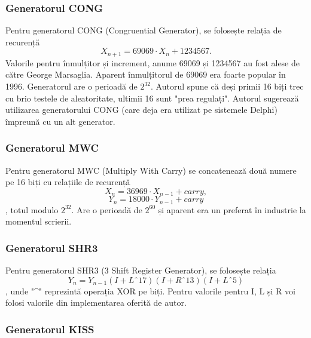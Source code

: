 \subsubsection{Generatorul CONG}

Pentru generatorul CONG (Congruential Generator), se folosește relația de recurență
\[
X_{n+1} = 69069 \cdot X_{n} + 1234567.
\]
Valorile pentru înmulțitor și increment, anume 69069 și 1234567 au fost alese de către George Marsaglia. Aparent înmulțitorul de 69069 era foarte popular în 1996. Generatorul are o perioadă de $2^{32}$. Autorul spune că deși primii 16 biți trec cu brio testele de aleatoritate, ultimii 16 sunt "prea regulați". Autorul sugerează utilizarea generatorului CONG (care deja era utilizat pe sistemele Delphi) împreună cu un alt generator.

\subsubsection{Generatorul MWC}

Pentru generatorul MWC (Multiply With Carry) se concatenează două numere pe 16 biți cu relațiile de recurență
\[
X_n = 36969 \cdot X_{n-1} + carry, 
\]
\[
Y_n = 18000 \cdot Y_{n-1} + carry
\],
totul modulo $2^{32}$. Are o perioadă de $2^{60}$ și aparent era un preferat în industrie la momentul scrierii.

\subsubsection{Generatorul SHR3}

Pentru generatorul SHR3 (3 Shift Register Generator), se folosește relația 
\[
Y_n = Y_{n-1} (I + L ˆ 17) (I + R ˆ 13) (I + L ˆ 5) 
\]
, unde "\textasciicircum" reprezintă operația XOR pe biți. Pentru valorile pentru I, L și R voi folosi valorile din implementarea oferită de autor.

\subsubsection{Generatorul KISS}

